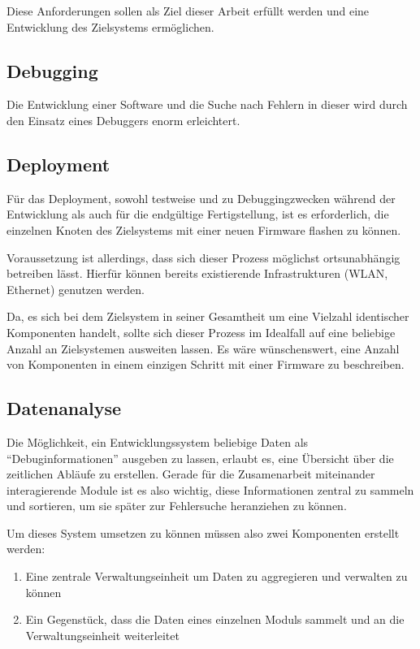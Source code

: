 Diese Anforderungen sollen als Ziel dieser Arbeit erfüllt werden und eine
Entwicklung des Zielsystems ermöglichen.

\subsection{Debugging} Die Entwicklung einer Software und die Suche nach Fehlern
in dieser wird durch den Einsatz eines Debuggers enorm erleichtert. 

\subsection{Deployment} Für das Deployment, sowohl testweise und zu
Debuggingzwecken während der Entwicklung als auch für die endgültige
Fertigstellung, ist es erforderlich, die einzelnen Knoten des Zielsystems mit
einer neuen Firmware flashen zu können.

Voraussetzung ist allerdings, dass sich dieser Prozess möglichst ortsunabhängig
betreiben lässt. Hierfür können bereits existierende Infrastrukturen (WLAN,
Ethernet) genutzen werden.

Da, es sich bei dem Zielsystem in seiner Gesamtheit um eine Vielzahl identischer
Komponenten handelt, sollte sich dieser Prozess im Idealfall auf
eine beliebige Anzahl an Zielsystemen ausweiten lassen. Es wäre wünschenswert,
eine Anzahl von Komponenten in einem einzigen Schritt mit einer Firmware zu
beschreiben.

\subsection{Datenanalyse} Die Möglichkeit, ein Entwicklungssystem beliebige
Daten als "`Debuginformationen"' ausgeben zu lassen, erlaubt es, eine
Übersicht über die zeitlichen Abläufe zu erstellen. Gerade für die
Zusamenarbeit miteinander interagierende Module ist es also wichtig, diese
Informationen zentral zu sammeln und sortieren, um sie später zur
Fehlersuche heranziehen zu können.

Um dieses System umsetzen zu können müssen also zwei Komponenten erstellt
werden:
\begin{enumerate}
  \item Eine zentrale Verwaltungseinheit um Daten zu aggregieren und verwalten
  zu können
  \item Ein Gegenstück, dass die Daten eines einzelnen Moduls sammelt und an die
  Verwaltungseinheit weiterleitet
\end{enumerate}


